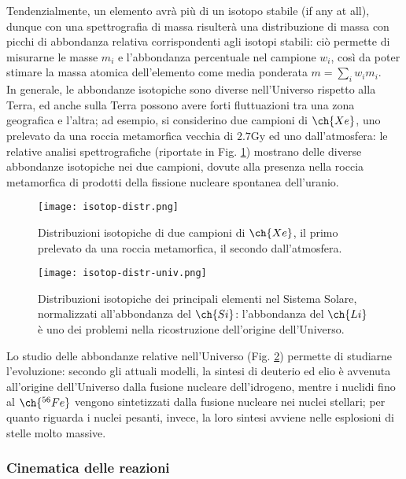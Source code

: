Tendenzialmente, un elemento avrà più di un isotopo stabile (if any at all), dunque con una spettrografia di massa risulterà una distribuzione di massa con picchi di abbondanza relativa corrispondenti agli isotopi stabili: ciò permette di misurarne le masse $ m_i $ e l'abbondanza percentuale nel campione $ w_i $, così da poter stimare la massa atomica dell'elemento come media ponderata $ m = \sum_{i} w_i m_i $.\\
In generale, le abbondanze isotopiche sono diverse nell'Universo rispetto alla Terra, ed anche sulla Terra possono avere forti fluttuazioni tra una zona geografica e l'altra; ad esempio, si considerino due campioni di $ \ch{Xe} $, uno prelevato da una roccia metamorfica vecchia di $ 2.7 \text{Gy} $ ed uno dall'atmosfera: le relative analisi spettrografiche (riportate in Fig. \ref{iso-distr}) mostrano delle diverse abbondanze isotopiche nei due campioni, dovute alla presenza nella roccia metamorfica di prodotti della fissione nucleare spontanea dell'uranio.
\begin{figure}[!b]
	\centering
	\texttt{[image: isotop-distr.png]}
	\caption{Distribuzioni isotopiche di due campioni di $ \ch{Xe} $, il primo prelevato da una roccia metamorfica, il secondo dall'atmosfera.}
	\label{iso-distr}
\end{figure}

\begin{figure}[!ht]
	\centering
	\texttt{[image: isotop-distr-univ.png]}
	\caption{Distribuzioni isotopiche dei principali elementi nel Sistema Solare, normalizzati all'abbondanza del $ \ch{Si} $: l'abbondanza del $ \ch{Li} $ è uno dei problemi nella ricostruzione dell'origine dell'Universo.}
	\label{iso-distr-univ}
\end{figure}
Lo studio delle abbondanze relative nell'Universo (Fig. \ref{iso-distr-univ}) permette di studiarne l'evoluzione: secondo gli attuali modelli, la sintesi di deuterio ed elio è avvenuta all'origine dell'Universo dalla fusione nucleare dell'idrogeno, mentre i nuclidi fino al $ \ch{^{56}Fe} $ vengono sintetizzati dalla fusione nucleare nei nuclei stellari; per quanto riguarda i nuclei pesanti, invece, la loro sintesi avviene nelle esplosioni di stelle molto massive.

\subsubsection{Cinematica delle reazioni}

